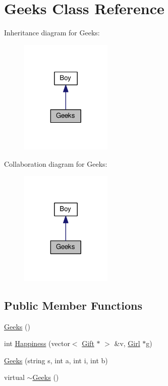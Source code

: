 \hypertarget{class_geeks}{\section{Geeks Class Reference}
\label{class_geeks}
}


Inheritance diagram for Geeks\-:
\nopagebreak
\begin{figure}[H]
\begin{center}
\leavevmode
\includegraphics[width=124pt]{class_geeks__inherit__graph}
\end{center}
\end{figure}


Collaboration diagram for Geeks\-:
\nopagebreak
\begin{figure}[H]
\begin{center}
\leavevmode
\includegraphics[width=124pt]{class_geeks__coll__graph}
\end{center}
\end{figure}
\subsection*{Public Member Functions}
\begin{DoxyCompactItemize}
\item 
\hyperlink{class_geeks_aa74bc287fb7987d0eeab122db9f40585}{Geeks} ()
\item 
int \hyperlink{class_geeks_aaca0a046a81aac048c8495f221e39273}{Happiness} (vector$<$ \hyperlink{class_gift}{Gift} $\ast$ $>$ \&v, \hyperlink{class_girl}{Girl} $\ast$g)
\item 
\hyperlink{class_geeks_a6f2f44f7beb410cb4f2394723f671a05}{Geeks} (string s, int a, int i, int b)
\item 
virtual \hyperlink{class_geeks_a9155669b99c16fa9c987d4671e4ecc3a}{$\sim$\-Geeks} ()
\end{DoxyCompactItemize}
